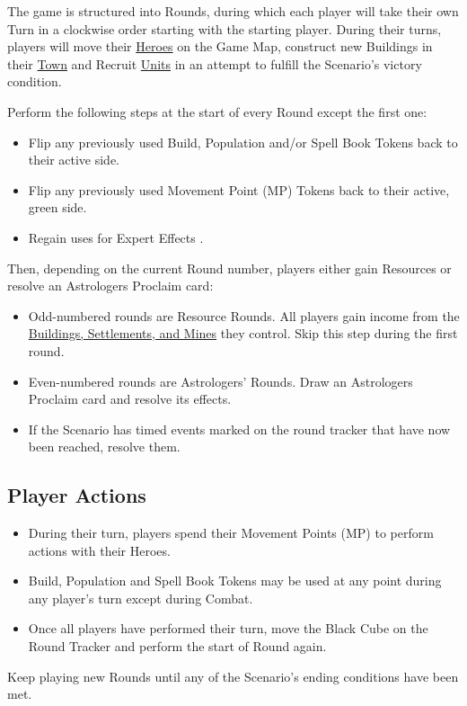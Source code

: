 The game is structured into Rounds, during which each player will take their own Turn in a clockwise order starting with the starting player.
During their turns, players will move their \hyperlink{Heroes}{Heroes} on the Game Map, construct new Buildings in their \hyperlink{Town}{Town} and Recruit \hyperlink{Units}{Units} in an attempt to fulfill the Scenario's victory condition.\par
Perform the following steps at the start of every Round except the first one:
\begin{itemize}
  \item Flip any previously used Build, Population and/or Spell Book Tokens back to their active side.
  \item Flip any previously used Movement Point (MP) Tokens back to their active, green side.
  \item Regain uses for Expert Effects .
\end{itemize}
Then, depending on the current Round number, players either gain Resources or resolve an Astrologers Proclaim card:
\begin{itemize}
  \item Odd-numbered rounds are Resource Rounds.
    All players gain income from the \hyperlink{Mines}{Buildings, Settlements, and Mines} they control.
    Skip this step during the first round.
  \item Even-numbered rounds are Astrologers' Rounds.
    Draw an Astrologers Proclaim card and resolve its effects.
  \item If the Scenario has timed events marked on the round tracker that have now been reached, resolve them.
\end{itemize}
\subsection*{Player Actions}
\begin{itemize}
  \item During their turn, players spend their Movement Points (MP) to perform actions with their Heroes.
  \item Build, Population and Spell Book Tokens may be used at any point during any player's turn except during Combat.
  \item Once all players have performed their turn, move the Black Cube on the Round Tracker and perform the start of Round again.
\end{itemize}
Keep playing new Rounds until any of the Scenario's ending conditions have been met.
